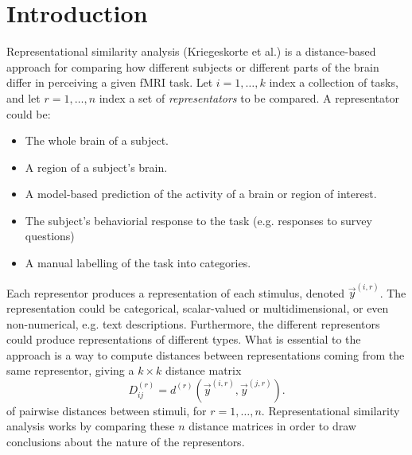 \documentclass[12pt]{article}
\begin{document}
\maketitle

\newcommand{\tr}{\text{tr}}
\newcommand{\E}{\textbf{E}}
\newcommand{\diag}{\text{diag}}
\newcommand{\argmax}{\text{argmax}}
\newcommand{\Cov}{\text{Cov}}
\newcommand{\Var}{\text{Var}}
\newcommand{\argmin}{\text{argmin}}
\newcommand{\Vol}{\text{Vol}}
\newcommand{\comm}[1]{}

\newcommand{\bx}{\boldsymbol{x}}
\newcommand{\by}{\boldsymbol{y}}
\newcommand{\bX}{\boldsymbol{X}}
\newcommand{\bY}{\boldsymbol{Y}}


\section{Introduction}

Representational similarity analysis (Kriegeskorte et al.) is a distance-based approach
for comparing how different subjects or different parts of the brain
differ in perceiving a given fMRI task.
Let $i = 1,\hdots, k$ index a collection of tasks,
and let $r = 1,\hdots, n$ index a set of \emph{representators} to be compared.
A representator could be:
\begin{itemize}
\item The whole brain of a subject.
\item A region of a subject's brain.
\item A model-based prediction of the activity of a brain or region of interest.
\item The subject's behaviorial response to the task (e.g. responses to survey questions)
\item A manual labelling of the task into categories.
\end{itemize}

Each representor produces a representation of each stimulus, denoted $\vec{y}^{(i, r)}$.
The representation could be categorical, scalar-valued or multidimensional,
or even non-numerical, e.g. text descriptions.
Furthermore, the different representors could produce representations of different types.
What is essential to the approach is a way to compute distances between representations coming
from the same representor, giving a $k \times k$ distance matrix
\[
D_{ij}^{(r)} = d^{(r)}(\vec{y}^{(i, r)}, \vec{y}^{(j, r)}).
\]
of pairwise distances between stimuli, for $r = 1,\hdots, n$.
Representational similarity analysis works by comparing these $n$ distance matrices
in order to draw conclusions about the nature of the representors.
\end{document}
